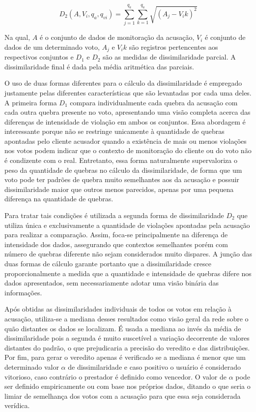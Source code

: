\begin{equation}
    D_2(A, V_i, q_a, q_{vi}) = \sum_{j = 1}^{q_a} \sum_{k = 1}^{q_a} \sqrt{(A_j - V_ik)^2}
\end{equation}

Na qual, $A$ é o conjunto de dados de monitoração da acusação, $V_i$ é conjunto de dados de um determinado voto, $A_j$ e $V_ik$ são registros pertencentes aos respectivos conjuntos e $D_1$ e $D_2$ são as medidas de dissimilaridade parcial. A dissimilaridade final é dada pela média aritmética das parciais. 

%
O uso de duas formas diferentes para o cálculo da dissimilaridade é empregado justamente pelas diferentes características que são levantadas por cada uma deles. A primeira forma $D_1$ compara individualmente cada quebra da acusação com cada outra quebra presente no voto, apresentando uma visão completa acerca das diferenças de intensidade de violação em ambos os conjuntos. Essa abordagem é interessante porque não se restringe unicamente à quantidade de quebras apontadas pelo cliente acusador quando a existência de mais ou menos violações nos votos podem indicar que o contexto de monitoração do cliente ou do voto não é condizente com o real. Entretanto, essa forma naturalmente supervaloriza o peso da quantidade de quebras no cálculo da dissimilaridade, de forma que um voto pode ter padrões de quebra muito semelhantes aos da acusação e possuir dissimilaridade maior que outros menos parecidos, apenas por uma pequena diferença na quantidade de quebras.

%
Para tratar tais condições é utilizada a segunda forma de dissimilaridade $D_2$ que utiliza única e exclusivamente a quantidade de violações apontadas pela acusação para realizar a comparação. Assim, foca-se principalmente na diferença de intensidade dos dados, assegurando que contextos semelhantes porém com número de quebras diferente não sejam considerados muito dispares. A junção das duas formas de cálculo garante portanto que a dissimilaridade cresce proporcionalmente a medida que a quantidade e intensidade de quebras difere nos dados apresentados, sem necessariamente adotar uma visão binária das informações.

%
Após obtidas as dissimilaridades individuais de todos os votos em relação à acusação, utiliza-se a mediana desses resultados como visão geral da rede sobre o quão distantes os dados se localizam. É usada a mediana ao invés da média de dissimilaridade pois a segunda é muito suscetível a variação decorrente de valores distantes do padrão, o que prejudicaria a precisão do veredito e das distribuições. Por fim, para gerar o veredito apenas é verificado se a mediana é menor que um determinado valor $\alpha$ de dissimilaridade e caso positivo o usuário é considerado vitorioso, caso contrário o prestador é definido como vencedor. O valor de $\alpha$ pode ser definido empiricamente ou com base nos próprios dados, ditando o que seria o limiar de semelhança dos votos com a acusação para que essa seja considerada verídica.

